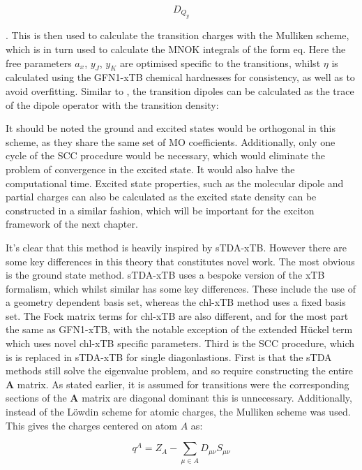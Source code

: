 \begin{equation}
D_{Q_y}
\end{equation}

. This is then used to calculate the transition charges with the Mulliken scheme,
which is in turn used to calculate the MNOK integrals of the form eq.
Here the free parameters $a_x$, $y_J$, $y_K$ are optimised specific to the \Qy 
transitions, whilst $\eta$ is calculated using the GFN1-xTB chemical hardnesses for
consistency, as well as to avoid overfitting. Similar to \dscf, the transition dipoles 
can be calculated as the trace of the dipole operator with the transition density:

It should be noted the ground and excited states would be orthogonal in this scheme,
as they share the same set of MO coefficients. Additionally, only one cycle of the
SCC procedure would be necessary, which would eliminate the problem of convergence
in the \dscf excited state. It would also halve the computational time.
Excited state properties, such as the molecular dipole and partial charges can
also be calculated as the excited state density can be constructed in a similar 
fashion, which will be important for the exciton framework of the next chapter.

It's clear that this method is heavily inspired by sTDA-xTB.
However there are some key differences in this theory that constitutes novel work.
The most obvious is the ground state method. sTDA-xTB uses a bespoke version of
the xTB formalism, which whilst similar has some key differences. These include 
the use of a geometry dependent basis set, whereas the chl-xTB method uses a fixed
basis set. The Fock matrix terms for chl-xTB are also different, and for the most
part the same as GFN1-xTB, with the notable exception of the extended H{\"u}ckel
term which uses novel chl-xTB specific parameters. Third is the SCC procedure, which
is is replaced in sTDA-xTB for single diagonlastions.
First is that the sTDA methods still solve the eigenvalue problem, and so require
constructing the entire $\mathbf{A}$ matrix. As stated earlier, it is assumed for
transitions were the corresponding sections of the $\mathbf{A}$ matrix are diagonal
dominant this is unnecessary. Additionally, instead of the L{\"o}wdin scheme for
atomic charges, the Mulliken scheme was used. This gives the charges centered
on atom $A$ as:

\begin{equation}
q^A = Z_A - \sum_{\mu \in A} D_{\mu\nu} S_{\mu\nu}
\end{equation}

